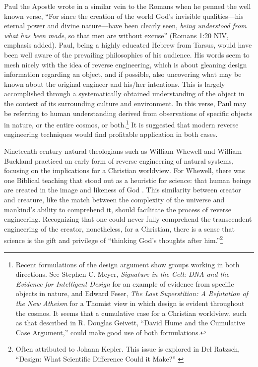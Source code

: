 Paul the Apostle wrote in a similar vein to the Romans when he penned
the well known verse, “For since the creation of the
world God's invisible qualities---his eternal power
and divine nature---have been clearly seen,
\textit{being understood from what has been
made}, so that men are without
excuse” (Romans 1:20 NIV, emphasis added).
Paul, being a highly educated Hebrew from Tarsus, would have been well
aware of the prevailing philosophies of his audience. His words seem to
mesh nicely with the idea of reverse engineering, which is about
gleaning design information regarding an object,
and if possible, also uncovering what may be
known about the original engineer and his/her
intentions. This is largely accomplished through a
systematically obtained understanding of the object in the context of
its surrounding culture and environment. In this verse, Paul may be
referring to human understanding derived from observations of specific
objects in nature, or the entire cosmos, or
both.\footnote{
Recent formulations of the design argument show
groups working in both directions. See Stephen C. Meyer,
\textit{Signature in the Cell: DNA and the Evidence for Intelligent
Design} \citep{meyer2009} for an example of evidence from
specific objects in nature, and Edward Feser, \textit{The Last
Superstition: A Refutation of the New Atheism} \citep{feser2008}
for a Thomist view in which design is evident
throughout the cosmos. It seems that a cumulative case for a Christian
worldview, such as that described in R. Douglas Geivett, “David Hume
and the Cumulative Case Argument,” \citep{geivett2005}
could make
good use of both formulations.
}
It is
suggested that modern reverse engineering techniques would find
profitable application in both cases.

Nineteenth century natural theologians such as William Whewell and
William Buckland practiced an early form of reverse engineering of
natural systems, focusing on the implications for a Christian
worldview. For Whewell, there was one Biblical teaching that stood out
as a heuristic for science: that human beings are created in the image
and likeness of God \citep[][p.~283]{fuller2006}. This similarity between
creator and creature, like the match between the complexity of the
universe and mankind’s ability to comprehend it, should facilitate the
process of reverse engineering. Recognizing that one could never fully
comprehend the transcendent engineering of the creator, nonetheless,
for a Christian, there is a sense that science is the gift and
privilege of ``thinking God’s thoughts after him.''\footnote{
Often attributed to Johann Kepler. This issue is
explored in Del Ratzsch, ``Design: What Scientific Difference Could it
Make?'' \citep{ratzsch2004}
}


